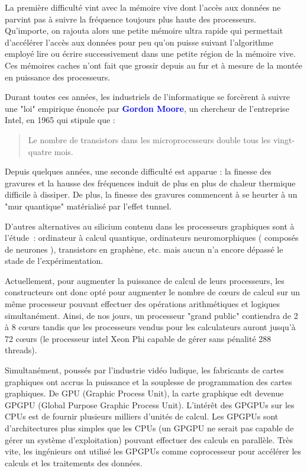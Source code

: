 \documentclass[fleqn,11pt]{article}
\begin{document}
La première difficulté vint avec la mémoire vive dont l'accès aux données ne parvint pas à suivre la fréquence toujours plus haute des processeurs. Qu'importe, on rajouta alors une petite mémoire ultra rapide qui permettait d'accélérer l'accès aux données pour peu qu'on puisse suivant l'algorithme employé lire ou écrire successivement dans une petite région de la mémoire vive. Ces mémoires caches n'ont fait que grossir depuis au fur et à mesure de la montée en puissance des processeurs. 

Durant toutes ces années, les industriels de l'informatique se forcèrent à suivre une "loi" empirique énoncée par \textbf{\textcolor{blue}{Gordon Moore}}, un chercheur de l'entreprise Intel, en 1965 qui  stipule que :
\begin{quote}
Le nombre de transistors dans les microprocesseurs double tous les vingt-quatre mois.
\end{quote}

Depuis quelques années, une seconde difficulté est apparue : la finesse des gravures et la hausse des fréquences induit de plus en plus de chaleur thermique difficile à dissiper. De plus, la finesse des gravures commencent à se heurter à un "mur quantique" matérialisé par l'effet tunnel.

D'autres alternatives au silicium contenu dans les processeurs graphiques sont à l'étude~: ordinateur à calcul quantique, ordinateurs neuromorphiques ( composés de neurones ), transistors en graphène, etc. mais aucun n'a encore dépassé le stade de l'expérimentation. 

Actuellement, pour augmenter la puissance de calcul de leurs processeurs, les constructeurs ont donc opté pour augmenter le nombre de c{\oe}urs de calcul sur un même processeur pouvant effectuer des opérations arithmétiques et logiques simultanément. Ainsi,  de nos jours, un processeur "grand public" contiendra de 2 à 8 c{\oe}urs tandis que les processeurs vendus pour les calculateurs auront jusqu'à 72 c{\oe}urs (le processeur intel Xeon Phi capable de gérer sans pénalité 288 threads).

Simultanément, poussés par l'industrie vidéo ludique, les fabricants de cartes graphiques ont accrus la puissance et la souplesse de programmation des cartes graphiques. De GPU (Graphic Process Unit), la carte graphique edt devenue GPGPU (Global Purpose Graphic Process Unit). L'intérêt des GPGPUs sur les CPUs est de fournir plusieurs milliers d'unités de calcul. Les GPGPUs sont d'architectures plus simples que les CPUs (un GPGPU ne serait pas capable de gérer un système d'exploitation) pouvant effectuer des calculs en parallèle.
Très vite, les ingénieurs ont utilisé les GPGPUs comme coprocesseur pour accélérer les calculs et les traitements des données. 
\end{document}
